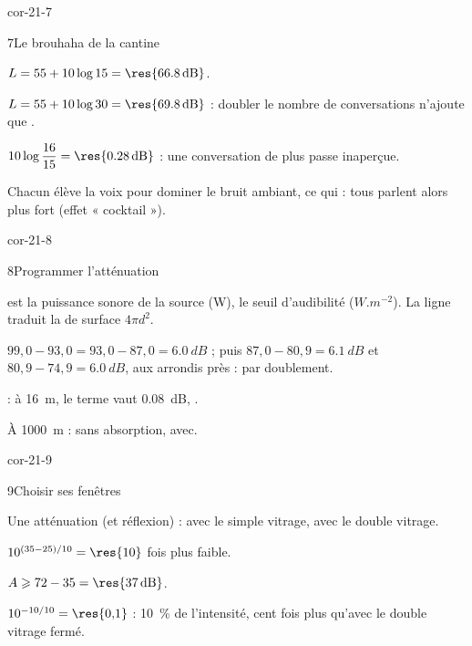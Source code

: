 \begin{blocLivre}{cor-21-7}
\begin{corrige}{7}{Le brouhaha de la cantine}
\begin{questions}
\item $L=55+10\log15=\res{\qty{66,8}{dB}}$.
\item $L=55+10\log30=\res{\qty{69,8}{dB}}$ : doubler le nombre de conversations n'ajoute que .
\item $10\log\dfrac{16}{15}=\res{\qty{0,28}{dB}}$ : une conversation de plus passe inaperçue.
\item Chacun élève la voix pour dominer le bruit ambiant, ce qui  : tous parlent alors plus fort
(effet « cocktail »).
\end{questions}
\end{corrige}
\end{blocLivre}
\begin{blocLivre}{cor-21-8}
\begin{corrige}{8}{Programmer l'atténuation}
\begin{questions}
\item {} est la puissance sonore de la source (W),  le seuil d'audibilité ($\unit{W.m^{-2}}$). La ligne traduit
la  de surface $4\pi d^2$.
\item $99{,}0-93{,}0=93{,}0-87{,}0=\qty{6,0}{dB}$ ; puis $87{,}0-80{,}9=\qty{6,1}{dB}$ et $80{,}9-74{,}9=\qty{6,0}{dB}$, aux arrondis
près :  par doublement.
\item {} : à \qty{16}{m}, le terme vaut \qty{0,08}{dB}, .
\item À \qty{1000}{m} :  sans absorption,  avec.
\end{questions}
\end{corrige}
\end{blocLivre}
\begin{blocLivre}{cor-21-9}
\begin{corrige}{9}{Choisir ses fenêtres}
\begin{questions}
\item Une atténuation  (et réflexion) :  avec le simple vitrage,  avec le
double vitrage.
\item $10^{(35-25)/10}=\res{10}$ fois plus faible.
\item $A\geqslant72-35=\res{\qty{37}{dB}}$.
\item $10^{-10/10}=\res{0{,}1}$ : 10~\% de l'intensité, cent fois plus qu'avec le double vitrage fermé.
\end{questions}
\end{corrige}
\end{blocLivre}
